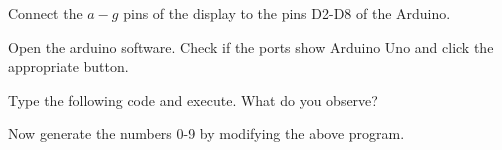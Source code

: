 \begin{problem}
Connect the $a-g$ pins of the display to the pins D2-D8 of the Arduino.
\end{problem}	
%
\begin{problem}
Open the arduino software.  Check if the ports show Arduino Uno and click the appropriate button.  
\end{problem}
\begin{problem}
\label{prob:first_code}
Type the following code and execute. What do you observe?

%
\end{problem}
\begin{problem}
Now generate the numbers 0-9 by modifying the above program.
\end{problem}
%

